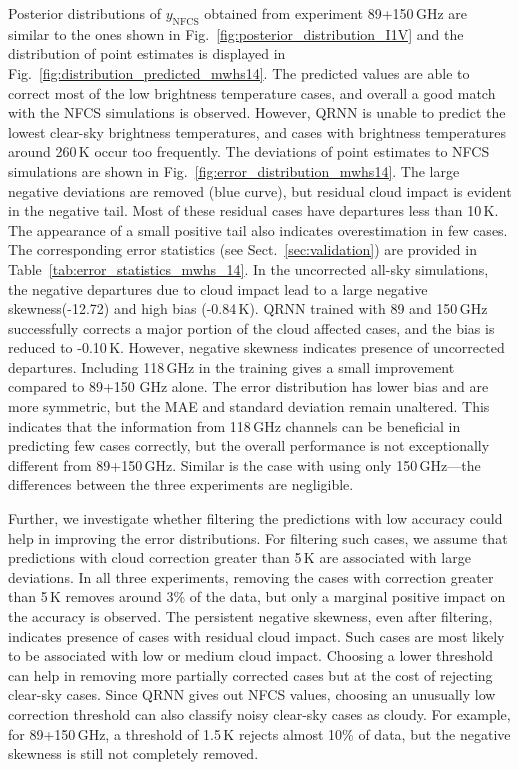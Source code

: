 \documentclass[amt, manuscript]{copernicus}
\newcommand{\ynfcs}{y_\text{NFCS}}
\begin{document}
Posterior distributions of $\ynfcs$ obtained from experiment 89+150\,GHz are similar to the ones shown in Fig.~\ref{fig:posterior_distribution_I1V} and the distribution of point estimates is displayed in Fig.~\ref{fig:distribution_predicted_mwhs14}. The predicted values are able to correct most of the low brightness temperature cases, and overall a good match with the NFCS simulations is observed. However, QRNN is unable to predict the lowest clear-sky brightness temperatures, and cases with brightness temperatures around 260\,K occur too frequently. The deviations of point estimates to NFCS simulations are shown in Fig.~\ref{fig:error_distribution_mwhs14}. The large negative deviations are removed (blue curve), but residual cloud impact is evident in the negative tail. Most of these residual cases have departures less than 10\,K. The appearance of a small positive tail also indicates overestimation in few cases. The corresponding error statistics (see Sect.~\ref{sec:validation}) are provided in  Table~\ref{tab:error_statistics_mwhs_14}. In the uncorrected all-sky simulations, the negative departures due to cloud impact lead to a large negative skewness(-12.72) and high bias (-0.84\,K). QRNN trained with 89 and 150\,GHz successfully corrects a major portion of the cloud affected cases, and the bias is reduced to -0.10\,K. However, negative skewness indicates presence of  uncorrected departures. Including 118\,GHz in the training gives a small improvement compared to 89+150 GHz alone. The error distribution has lower bias and are more symmetric, but the MAE and standard deviation remain unaltered. This indicates that the information from 118\,GHz channels can be beneficial in predicting few cases correctly, but the overall performance is not exceptionally different from 89+150\,GHz. Similar is the case with using only 150\,GHz---the differences between the three experiments are negligible.

Further, we investigate whether filtering the predictions with low accuracy could help in improving the error distributions. For filtering such cases, we assume that predictions with cloud correction greater than 5\,K are associated with large deviations. In all three experiments, removing the cases with correction greater than 5\,K removes around 3\% of the data, but only a marginal positive impact on the accuracy is observed. The persistent negative skewness, even after filtering, indicates presence of cases with residual cloud impact. Such cases are most likely to be associated with low or medium cloud impact. Choosing a lower threshold can help in removing more partially corrected cases but at the cost of rejecting clear-sky cases. Since QRNN gives out NFCS values, choosing an unusually low correction threshold can also classify noisy clear-sky cases as cloudy. For example, for 89+150\,GHz, a threshold of 1.5\,K rejects almost 10\% of data, but the negative skewness is still not completely removed.  
\end{document}
